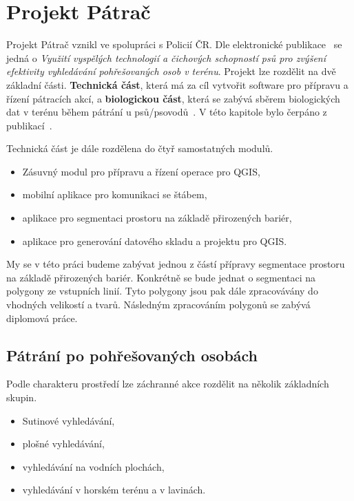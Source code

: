 \chapter{Projekt Pátrač} 
\label{chap:searchandrescue}

Projekt Pátrač vznikl ve spolupráci s Policií ČR. Dle elektronické
publikace~\cite{chaloupkova2017vyuziti} se jedná o \textit{Využití
  vyspělých technologií a čichových schopností psů pro zvýšení
  efektivity vyhledávání pohřešovaných osob v terénu}. Projekt lze
rozdělit na dvě základní části. \textbf{Technická část}, která má za
cíl vytvořit software pro přípravu a řízení pátracích akcí, a
\textbf{biologickou část}, která se zabývá sběrem biologických dat v
terénu během pátrání u psů/psovodů~\cite{Zeman2009thesis}. V této
kapitole bylo čerpáno z publikací~\cite{sladkova2019aplikace,
  Zeman2009thesis, pavlista2009rizeni, zachrana}.
	
	Technická část je dále rozdělena do čtyř samostatných modulů.
\begin{itemize}
	\item Zásuvný modul pro přípravu a řízení operace pro QGIS,
	\item mobilní aplikace pro komunikaci se štábem,
	\item aplikace pro segmentaci prostoru na základě přirozených bariér,
	\item aplikace pro generování datového skladu a projektu pro QGIS.
\end{itemize}	
My se v této práci budeme zabývat jednou z částí přípravy segmentace
prostoru na základě přirozených bariér. Konkrétně se bude jednat o
segmentaci na polygony ze vstupních linií. Tyto polygony jsou pak dále
zpracovávány do vhodných velikostí a tvarů. Následným zpracováním
polygonů se zabývá diplomová práce.

\section{Pátrání po pohřešovaných osobách}
	Podle charakteru prostředí lze záchranné akce rozdělit na několik základních skupin.
	
\begin{itemize}
	\item Sutinové vyhledávání,
	\item plošné vyhledávání,
	\item vyhledávání na vodních plochách,
	\item vyhledávání v horském terénu a v lavinách.
\end{itemize}	
	
